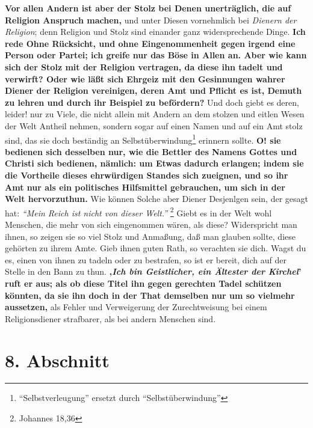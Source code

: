 \textbf{Vor allen Andern ist aber der Stolz bei Denen
unerträglich, die auf Religion
Anspruch machen,} und unter Diesen vornehmlich bei \textit{Dienern der
Religion}; denn
Religion und Stolz sind einander ganz widersprechende Dinge. \textbf{Ich rede
Ohne
Rücksicht, und ohne Eingenommenheit gegen irgend eine Person oder Partei; ich
greife nur das Böse in Allen an. Aber wie kann sich der Stolz
mit der Religion
vertragen, da diese ihn tadelt und verwirft? Oder wie läßt sich Ehrgeiz mit den
Gesinnungen wahrer Diener der Religion vereinigen, deren Amt und Pflicht es ist,
Demuth zu lehren und durch ihr Beispiel zu befördern?} Und doch giebt es deren,
leider! nur zu Viele, die nicht allein mit Andern an dem stolzen und eitlen
Wesen der Welt Antheil nehmen, sondern sogar auf einen Namen und auf ein Amt
stolz sind, das sie doch beständig an
Selbstüberwindung\footnote{"`Selbstverleugung"' ersetzt durch
"`Selbstüberwindung"'} erinnern sollte. \textbf{O! sie
bedienen sich desselben nur, wie die Bettler des Namens Gottes und Christi sich
bedienen, nämlich: um Etwas dadurch erlangen; indem sie die Vortheile dieses
ehrwürdigen Standes sich zueignen, und so ihr Amt nur als ein politisches
Hilfsmittel gebrauchen, um sich in der Welt hervorzuthun.} Wie können Solche
aber
Diener Desjenlgen sein, der gesagt hat:
\textit{"`Mein Reich ist nicht von dieser
Welt."'}
\footnote{Johannes 18,36}
Giebt es in der Welt wohl Menschen, die mehr von
sich eingenommen wären, als diese? Widerspricht man ihnen, so zeigen sie so viel
Stolz und Anmaßung, daß man glauben sollte, diese gehörten zu ihrem Amte. Gieb
ihnen guten Rath, so verachten sie dich. Wagst du es, einen von ihnen zu tadeln
oder zu bestrafen, so ist er bereit, dich auf der Stelle in den Bann
zu thun.
\textbf{‚\textit{Ich bin Geistlicher, ein Ältester der Kirchel}’ ruft er aus;
als ob diese Titel
ihn gegen gerechten Tadel schützen könnten, da sie ihn doch in der That
demselben nur um so vielmehr aussetzen,} als Fehler und Verweigerung der
Zurechtweisung bei einem Religionsdiener strafbarer, als bei andern Menschen
sind.

\section{8. Abschnitt} \label{kap12_ab8}

